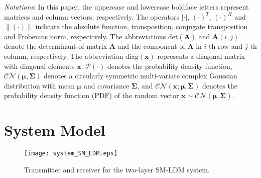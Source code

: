 \documentclass[journal]{IEEEtran}
\begin{document}
\emph{Notations}: In this paper, the uppercase and lowercase boldface letters represent matrices and column vectors, respectively. The operators $| \cdot |$, $(\cdot)^T$, $(\cdot)^H$ and $\|(\cdot)\|$ indicate the absolute function, transposition, conjugate transposition and Frobenius norm, respectively. The abbreviations $\text{det}(\mathbf{A})$ and $\mathbf{A}(i,j)$ denote the determinant of matrix $\mathbf{A}$ and the component of $\mathbf{A}$ in $i$-th row and $j$-th column, respectively. The abbreviation diag$(\mathbf{x})$ represents a diagonal matrix with diagonal elements $\mathbf{x}$. $\mathcal{P}(\cdot)$ denotes the probability density function, $\mathcal{CN}(\boldsymbol{\mu}, \mathbf{\Sigma})$ denotes a circularly symmetric multi-variate complex Gaussian distribution with mean $\boldsymbol{\mu}$ and covariance $\mathbf{\Sigma}$, and $\mathcal{CN}(\mathbf{x}; \boldsymbol{\mu}, \mathbf{\Sigma})$ denotes the probability density function (PDF) of the random vector $\mathbf{x} \sim \mathcal{CN}(\boldsymbol{\mu}, \mathbf{\Sigma})$.


\section{System Model}

\begin{figure}
  \centering
  \texttt{[image: system\_SM\_LDM.eps]}
  \caption{Transmitter and receiver for the two-layer SM-LDM system.}\label{system_SM_LDM}
\end{figure}
\end{document}
